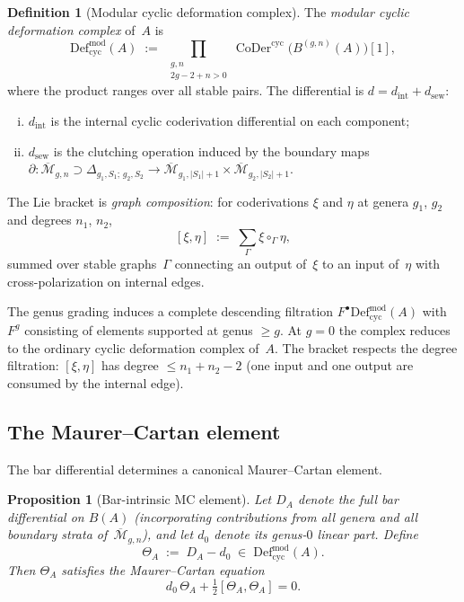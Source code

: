 \documentclass[11pt]{article}
\theoremstyle{plain}
\newtheorem{proposition}[theorem]{Proposition}
\theoremstyle{definition}
\newtheorem{definition}[theorem]{Definition}
\theoremstyle{remark}
\newcommand{\Defcyc}{\mathrm{Def}_{\mathrm{cyc}}}
\newcommand{\Mbar}{\overline{\mathcal{M}}}
\begin{document}
\begin{definition}[Modular cyclic deformation complex]
\label{def:mod-cyc}
The \emph{modular cyclic deformation complex} of~$A$ is
\begin{equation}\label{eq:mod-cyc}
 \Defcyc^{\mathrm{mod}}(A)
 \;:=\;
 \prod_{\substack{g,n \\ 2g-2+n>0}}
 \operatorname{CoDer}^{\mathrm{cyc}}\!\bigl(
 B^{(g,n)}(A)
 \bigr)[1],
\end{equation}
where the product ranges over all stable pairs.
The differential is $d = d_{\mathrm{int}} + d_{\mathrm{sew}}$:
\begin{enumerate}[(i)]
\item $d_{\mathrm{int}}$ is the internal cyclic coderivation
 differential on each component;
\item $d_{\mathrm{sew}}$ is the clutching operation induced by
 the boundary maps
 $\partial\colon \Mbar_{g,n} \supset
 \Delta_{g_1,S_1;\,g_2,S_2} \to
 \Mbar_{g_1,|S_1|+1} \times
 \Mbar_{g_2,|S_2|+1}$.
\end{enumerate}
The Lie bracket is \emph{graph composition}: for coderivations
$\xi$ and $\eta$ at genera $g_1$, $g_2$ and degrees $n_1$, $n_2$,
\begin{equation}\label{eq:graph-bracket}
 [\xi,\eta]
 \;:=\;
 \sum_{\Gamma}\xi \circ_\Gamma \eta,
\end{equation}
summed over stable graphs~$\Gamma$ connecting an output of~$\xi$
to an input of~$\eta$ with cross-polarization on internal edges.
\end{definition}

The genus grading induces a complete descending filtration
$F^{\bullet}\Defcyc^{\mathrm{mod}}(A)$ with $F^g$
consisting of elements supported at genus $\geq g$.
At $g = 0$ the complex reduces to the ordinary cyclic
deformation complex of~$A$. The bracket respects the
degree filtration: $[\xi, \eta]$ has degree $\leq n_1 + n_2 - 2$
(one input and one output are consumed by the internal edge).


\subsection{The Maurer--Cartan element}

The bar differential determines a canonical Maurer--Cartan element.

\begin{proposition}[Bar-intrinsic MC element]
\label{prop:bar-mc}
Let $D_A$ denote the full bar differential on $B(A)$
(incorporating contributions from all genera and all boundary
strata of~$\Mbar_{g,n}$), and let $d_0$ denote its genus-$0$
linear part. Define
\begin{equation}\label{eq:theta-def}
 \Theta_A \;:=\; D_A - d_0
 \;\in\; \Defcyc^{\mathrm{mod}}(A).
\end{equation}
Then $\Theta_A$ satisfies the Maurer--Cartan equation
\begin{equation}\label{eq:mc-equation}
 d_0\,\Theta_A + \tfrac{1}{2}[\Theta_A, \Theta_A] = 0.
\end{equation}
\end{proposition}
\end{document}
